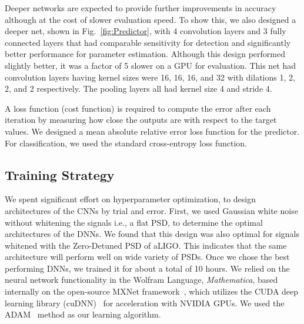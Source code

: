 \documentclass[aps,prd,%
amsmath,floats,floatfix, twocolumn, superscriptaddress,nofootinbib,showpacs]{revtex4-1}
\begin{document}
Deeper networks are expected to provide further improvements in accuracy although at the cost of slower evaluation speed. To show this, we also designed a deeper net, shown in Fig.~\ref{fig:Predictor}, with 4 convolution layers and 3 fully connected layers that had comparable sensitivity for detection and significantly better performance for parameter estimation. Although this design performed slightly better, it was a factor of 5 slower on a GPU for evaluation.  This net had convolution layers having kernel sizes were 16, 16, 16, and 32 with dilations 1, 2, 2, and 2 respectively. The pooling layers all had kernel size 4 and stride 4.

A loss function (cost function) is required to compute the error after each iteration by measuring how close the outputs are with respect to the target values. We designed a mean absolute relative error loss function for the predictor. For classification, we used the standard cross-entropy loss function.

\subsection*{Training Strategy}

We spent significant effort on hyperparameter optimization, to design architectures of the CNNs by trial and error. First, we used Gaussian white noise without whitening the signals i.e., a flat PSD, to determine the optimal architectures of the DNNs. We found that this design was also optimal for signals whitened with the Zero-Detuned PSD of aLIGO. This indicates that the same architecture will perform well on wide variety of PSDs. Once we chose the best performing DNNs, we trained it for about a total of 10 hours. We relied on the neural network functionality in the Wolfram Language, \textit{Mathematica}, based internally on the open-source MXNet framework~\cite{MXNet}, which utilizes the CUDA deep learning library (cuDNN)~\cite{cuDNN} for acceleration with NVIDIA GPUs. We used the ADAM~\cite{ADAM} method as our learning algorithm. 
\end{document}
